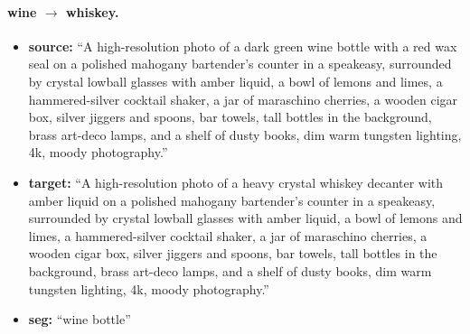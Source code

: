 \paragraph{wine $\to$ whiskey.}
\begin{itemize}
    \item \textbf{source:} ``A high-resolution photo of a dark green wine bottle with a red wax seal on a polished mahogany bartender's counter in a speakeasy, surrounded by crystal lowball glasses with amber liquid, a bowl of lemons and limes, a hammered-silver cocktail shaker, a jar of maraschino cherries, a wooden cigar box, silver jiggers and spoons, bar towels, tall bottles in the background, brass art-deco lamps, and a shelf of dusty books, dim warm tungsten lighting, 4k, moody photography.''
    \item \textbf{target:} ``A high-resolution photo of a heavy crystal whiskey decanter with amber liquid on a polished mahogany bartender's counter in a speakeasy, surrounded by crystal lowball glasses with amber liquid, a bowl of lemons and limes, a hammered-silver cocktail shaker, a jar of maraschino cherries, a wooden cigar box, silver jiggers and spoons, bar towels, tall bottles in the background, brass art-deco lamps, and a shelf of dusty books, dim warm tungsten lighting, 4k, moody photography.''
    \item \textbf{seg:} ``wine bottle''
\end{itemize}
